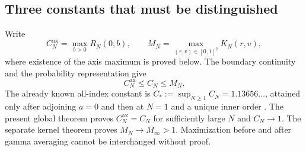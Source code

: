 \subsection{Three constants that must be distinguished}

Write
\[
 C_N^{\mathrm{ax}}=\max_{b>0}R_N(0,b),\qquad
 M_N=\max_{(r,v)\in[0,1]^2}K_N(r,v),
\]
where existence of the axis maximum is proved below. The boundary
continuity and the probability representation give
\begin{equation}\label{eq:constant-hierarchy}
 C_N^{\mathrm{ax}}\leq C_N\leq M_N.
\end{equation}
The already known all-index constant is
$C_*:=\sup_{N\geq1}C_N=1.13656\ldots$, attained only after adjoining
$a=0$ and then at $N=1$ and a unique inner order
\cite{ProveItSnapshot,SharpEulerIncoming}. The present global theorem
proves $C_N^{\mathrm{ax}}=C_N$ for sufficiently large $N$ and $C_N\to1$. The separate
kernel theorem proves $M_N\to M_\infty>1$. Maximization before and after
gamma averaging cannot be interchanged without proof.

